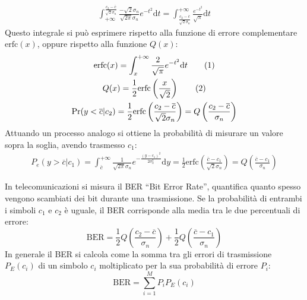 \documentclass{article}
\newcommand{\df}{\mathrm{d}}
\newcommand{\tageq}{\tag{\stepcounter{equation}\theequation}}
\numberwithin{equation}{subsection}
\begin{document}
\begin{gather*}
    \displaystyle\int_{+\infty}^{\frac{c_2-\overline{c}}{\sqrt2\sigma_n}}\frac{-\sqrt2\sigma_n}{\sqrt{2\pi}\sigma_n}e^{-t^2}\df t=\int_{\frac{c_2-\overline{c}}{\sqrt2\sigma_n}}^{+\infty}\frac{e^{-t^2}}{\sqrt\pi}\df t
\end{gather*}
Questo integrale si può esprimere rispetto alla funzione di errore complementare $\mathrm{erfc}(x)$, oppure rispetto alla funzione $Q(x)$:
\begin{gather*}
    \mathrm{erfc}(x)=\displaystyle\int_{x}^{+\infty}\frac{2}{\sqrt\pi}e^{-t^2}{\df t}\tageq\\
    Q(x)=\displaystyle\frac{1}{2}\mathrm{erfc}\left(\frac{x}{\sqrt2}\right)\tageq\\
    \Pr(y<\overline{c}|c_2)=\displaystyle\frac{1}{2}\mathrm{erfc}\left(\frac{c_2-\overline{c}}{\sqrt{2}\sigma_n}\right)=Q\left(\frac{c_2-\overline{c}}{\sigma_n}\right)
\end{gather*}
Attuando un processo analogo si ottiene la probabilità di misurare un valore sopra la soglia, avendo trasmesso $c_1$:
\begin{gather*}
    P_e(y>\overline{c}|c_1)=\int_{\overline{c}}^{+\infty}\frac{1}{\sqrt{2\pi}\sigma_n}e^{-\frac{(y-c_1)^2}{2\sigma_n^2}}\df y=\frac{1}{2}\mathrm{erfc}\left(\frac{\overline{c}-c_1}{\sqrt{2}\sigma_n}\right)=Q\left(\frac{\overline{c}-c_1}{\sigma_n}\right)
\end{gather*}

In telecomunicazioni si misura il BER ``Bit Error Rate'', quantifica quanto spesso vengono scambiati dei bit durante una trasmissione. Se la probabilità di entrambi 
i simboli $c_1$ e $c_2$ è uguale, il BER corrisponde alla media tra le due percentuali di errore:
\begin{equation*}
    \mathrm{BER}=\displaystyle\frac{1}{2}Q\left(\frac{c_2-\overline{c}}{\sigma_n}\right)+\frac{1}{2}Q\left(\frac{\overline{c}-c_1}{\sigma_n}\right)
\end{equation*}
In generale il BER si calcola come la somma tra gli errori di trasmissione $P_E(c_i)$ di un simbolo $c_i$ moltiplicato per la sua probabilità di errore $P_i$:
\begin{equation*}
    \mathrm{BER}=\displaystyle\sum_{i=1}^MP_{i}P_E(c_i)
\end{equation*}
\end{document}
